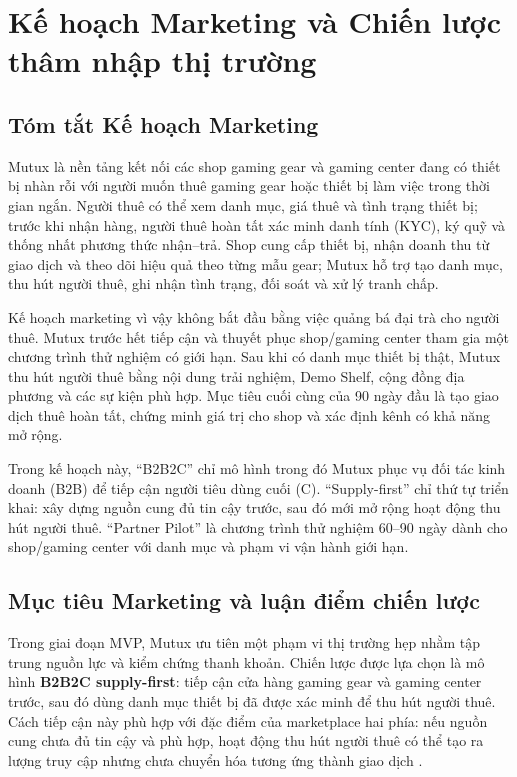 \section{Kế hoạch Marketing và Chiến lược thâm nhập thị trường}

\subsection{Tóm tắt Kế hoạch Marketing}

Mutux là nền tảng kết nối các shop gaming gear và gaming center đang có thiết bị nhàn rỗi với người muốn thuê gaming gear hoặc thiết bị làm việc trong thời gian ngắn. Người thuê có thể xem danh mục, giá thuê và tình trạng thiết bị; trước khi nhận hàng, người thuê hoàn tất xác minh danh tính (KYC), ký quỹ và thống nhất phương thức nhận--trả. Shop cung cấp thiết bị, nhận doanh thu từ giao dịch và theo dõi hiệu quả theo từng mẫu gear; Mutux hỗ trợ tạo danh mục, thu hút người thuê, ghi nhận tình trạng, đối soát và xử lý tranh chấp.

Kế hoạch marketing vì vậy không bắt đầu bằng việc quảng bá đại trà cho người thuê. Mutux trước hết tiếp cận và thuyết phục shop/gaming center tham gia một chương trình thử nghiệm có giới hạn. Sau khi có danh mục thiết bị thật, Mutux thu hút người thuê bằng nội dung trải nghiệm, Demo Shelf, cộng đồng địa phương và các sự kiện phù hợp. Mục tiêu cuối cùng của 90 ngày đầu là tạo giao dịch thuê hoàn tất, chứng minh giá trị cho shop và xác định kênh có khả năng mở rộng.

Trong kế hoạch này, ``B2B2C'' chỉ mô hình trong đó Mutux phục vụ đối tác kinh doanh (B2B) để tiếp cận người tiêu dùng cuối (C). ``Supply-first'' chỉ thứ tự triển khai: xây dựng nguồn cung đủ tin cậy trước, sau đó mới mở rộng hoạt động thu hút người thuê. ``Partner Pilot'' là chương trình thử nghiệm 60--90 ngày dành cho shop/gaming center với danh mục và phạm vi vận hành giới hạn.

\subsection{Mục tiêu Marketing và luận điểm chiến lược}

Trong giai đoạn MVP, Mutux ưu tiên một phạm vi thị trường hẹp nhằm tập trung nguồn lực và kiểm chứng thanh khoản. Chiến lược được lựa chọn là mô hình \textbf{B2B2C supply-first}: tiếp cận cửa hàng gaming gear và gaming center trước, sau đó dùng danh mục thiết bị đã được xác minh để thu hút người thuê. Cách tiếp cận này phù hợp với đặc điểm của marketplace hai phía: nếu nguồn cung chưa đủ tin cậy và phù hợp, hoạt động thu hút người thuê có thể tạo ra lượng truy cập nhưng chưa chuyển hóa tương ứng thành giao dịch \cite{rochetTirole2003,chen2021coldstart}.

